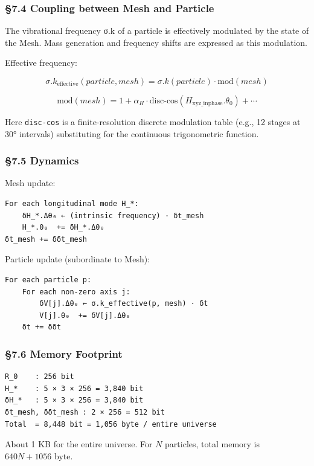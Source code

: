 \documentclass[a4paper,11pt]{article}
\begin{document}
\subsubsection{§7.4 Coupling between Mesh and
Particle}\label{coupling-between-mesh-and-particle}

The vibrational frequency σ.k of a particle is effectively modulated by
the state of the Mesh. Mass generation and frequency shifts are
expressed as this modulation.

Effective frequency:

\[\sigma.k_{\text{effective}}(particle, mesh) = \sigma.k(particle) \cdot \text{mod}(mesh)\]

\[\text{mod}(mesh) = 1 + \alpha_H \cdot \text{disc-cos}(H_{\text{xyz\_inphase}}.\theta_0) + \cdots\]

Here \texttt{disc-cos} is a finite-resolution discrete modulation table
(e.g., 12 stages at 30° intervals) substituting for the continuous
trigonometric function.

\subsubsection{§7.5 Dynamics}\label{dynamics}

Mesh update:

\begin{verbatim}
For each longitudinal mode H_*:
    δH_*.Δθ₀ ← (intrinsic frequency) · δt_mesh
    H_*.θ₀  += δH_*.Δθ₀
δt_mesh += δδt_mesh
\end{verbatim}

Particle update (subordinate to Mesh):

\begin{verbatim}
For each particle p:
    For each non-zero axis j:
        δV[j].Δθ₀ ← σ.k_effective(p, mesh) · δt
        V[j].θ₀  += δV[j].Δθ₀
    δt += δδt
\end{verbatim}

\subsubsection{§7.6 Memory Footprint}\label{memory-footprint-1}

\begin{verbatim}
R_0    : 256 bit
H_*    : 5 × 3 × 256 = 3,840 bit
δH_*   : 5 × 3 × 256 = 3,840 bit
δt_mesh, δδt_mesh : 2 × 256 = 512 bit
Total  = 8,448 bit = 1,056 byte / entire universe
\end{verbatim}

About 1 KB for the entire universe. For \(N\) particles, total memory is
\(640N + 1056\) byte.
\end{document}
